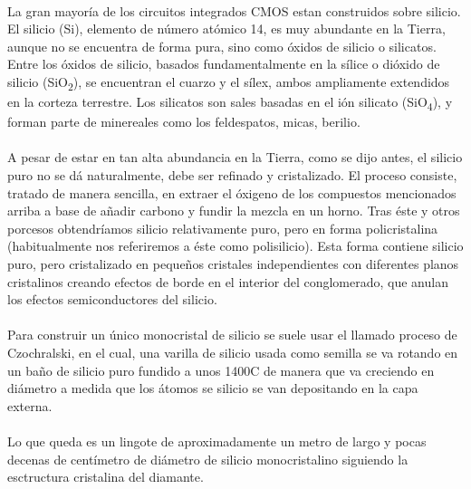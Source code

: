 \paragraph{}
La gran mayoría de los circuitos integrados CMOS estan construidos sobre silicio.
El silicio (Si), elemento de número atómico 14, es muy abundante en la Tierra, aunque
no se encuentra de forma pura, sino como óxidos de silicio o silicatos. Entre los
óxidos de silicio, basados fundamentalmente en la sílice o dióxido de silicio
(SiO\textsubscript{2}), se encuentran el cuarzo y el sílex, ambos ampliamente extendidos
en la corteza terrestre. Los silicatos son sales basadas en el ión silicato (SiO\textsubscript{4}),
y forman parte de minereales como los feldespatos, micas, berilio.


\paragraph{}
A pesar de estar en tan alta abundancia en la Tierra, como se dijo antes, el silicio
puro no se dá naturalmente, debe ser refinado y cristalizado. El proceso consiste,
tratado de manera sencilla, en extraer el óxigeno de los compuestos mencionados arriba
a base de añadir carbono y fundir la mezcla en un horno. Tras éste y otros porcesos
obtendríamos silicio relativamente puro, pero en forma policristalina (habitualmente
nos referiremos a éste como polisilicio). Esta forma contiene silicio puro, pero
cristalizado en pequeños cristales independientes con diferentes planos cristalinos
creando efectos de borde en el interior del conglomerado, que anulan los efectos
semiconductores del silicio.

\paragraph{}
Para construir un único monocristal de silicio se suele usar el llamado proceso
de Czochralski, en el cual, una varilla de silicio usada como semilla se va
rotando en un baño de silicio puro fundido a unos 1400\grad C de manera que va creciendo
en diámetro a medida que los átomos se silicio se van depositando en la capa externa.

\paragraph{}
Lo que queda es un lingote de aproximadamente un metro de largo y pocas decenas
de centímetro de diámetro de silicio monocristalino siguiendo la esctructura cristalina del
diamante.

